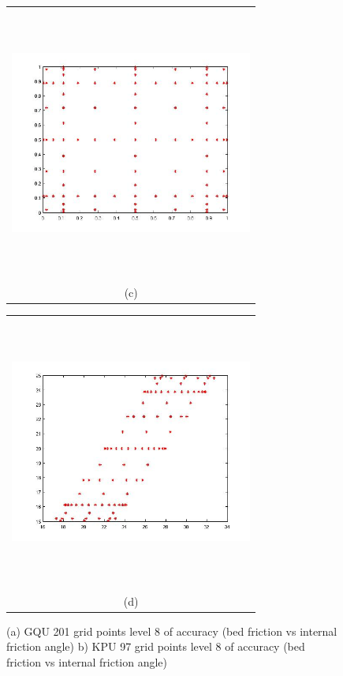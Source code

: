 \documentclass{article}
\newcommand{\Pic}[2][0.85]{\begin{center}\texttt{[image: \#2]}
 \end{center} }
\begin{document}
\begin{figure}[H]
\begin{minipage}{0.6\textwidth}
    \end{minipage} 
    \begin{minipage}[b]{0.6\textwidth}
        \begin{tabular}{c}
       \includegraphics[width=8cm,height=9cm,keepaspectratio]{fig/KPU_a_97.jpg}\\
        (c)
        \end{tabular}
    \end{minipage}
    \begin{minipage}{0.6\textwidth}
        \begin{tabular}{c}
	\includegraphics[width=8cm,height=9cm,keepaspectratio]{fig/KPU_b_97.jpg}\\
        (d)
        \end{tabular}
    \end{minipage} 
\caption{(a) GQU 201 grid points level 8 of accuracy (bed friction 
vs internal friction angle) b) KPU 97 grid points level 8 of accuracy
(bed friction vs internal friction angle)}
\label{fig2}  
\end{figure}
\end{document}
